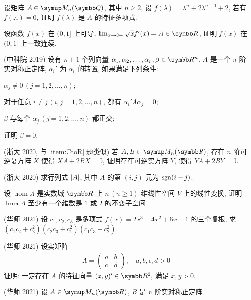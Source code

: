 \documentclass{ctexart}
\begin{document}
\begin{exercise}[resume=exer]
        \item 设矩阵 $ A \in \MM[\Q] $, 其中 $ n\ge 2 $, 设 $ f(\lambda) = \lambda^{n} + 2\lambda^{n-1} + 2 $, 若有 $ f(A) = 0 $, 证明 $ f(\lambda) $ 是 $ A $ 的特征多项式.
        \item 设函数 $ f(x) $ 在 $ (0, 1] $ 上可导, $ \limit{x}{0+} \sqrt{x}f'(x) = A\in \R $, 证明 $ f(x) $ 在 $ (0, 1] $ 上一致连续.
        \item (中科院 2019) 设有 $ n + 1 $ 个列向量 $ \alpha_{1}, \alpha_{2}, \dots, \alpha_{n}, \beta \in \R^{n} $, $ A $ 是一个 $ n $ 阶实对称正定阵, $ \alpha_{i}' $ 为 $ \alpha_{i} $ 的转置, 如果满足下列条件: 
        \begin{exercise}
            \item $ \alpha_{j} \ne 0\, (j = 1, 2, \dots, n) $;
            \item 对于任意 $ i \ne j \,(i, j = 1, 2, \dots, n) $, 都有 $ \alpha_{i}' A \alpha_{j} = 0 $;
            \item $ \beta $ 与每个 $ \alpha_{j}\,(j = 1, 2, \dots, n) $ 都正交; 
        \end{exercise}
        证明 $ \beta = 0 $.
        \item (浙大 2020, 与 \ref{item:CtoR} 题类似) 若 $ A, B \in \MM $, 存在 $ n $ 阶可逆复方阵 $ X $ 使得 $ XA + 2BX = 0 $, 证明存在可逆实方阵 $ Y $, 使得 $ YA + 2BY = 0 $. 
        \item (浙大 2020) 求行列式 $ \abs{A} $, 其中 $ A $ 的第 $ (i, j) $ 元为 $ \operatorname{sgn}(i - j) $.
        \item  设 $ \hom{A} $ 是实数域 $ \R $ 上 $ n\,(n\ge 1) $ 维线性空间 $ V $ 上的线性变换, 证明 $ \hom{A} $ 至少有一个维数是 $ 1 $ 或 $ 2 $ 的不变子空间.
        \item (华师 2021) 设 $ c_{1}, c_{2}, c_{3} $ 是多项式 $ f(x) = 2x^{3} - 4x^{2} + 6x - 1 $ 的三个复根, 求 $ (c_{1}c_{2} + c_{3}^{2})(c_{2}c_{3} + c_{1}^{2})(c_{1}c_{3} + c_{2}^{2}) $.
        \item (华师 2021) 设实矩阵
        \begin{align*}
            A = \begin{pmatrix}
                a & b \\ c & d
            \end{pmatrix},\quad a, b, c, d > 0
        \end{align*}
        证明: 一定存在 $ A $ 的特征向量 $ (x, y)'\in \R^{2} $, 满足 $ x, y > 0 $.
        \item (华师 2021) 设 $ A \in \MM $, $ B $ 是 $ n $ 阶实对称正定阵. 
        \begin{exercise}

\end{exercise}
\end{exercise}
\end{document}
